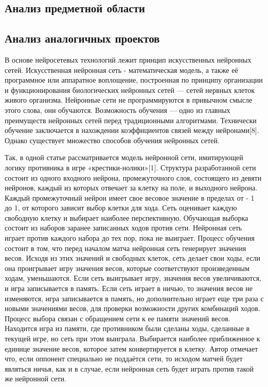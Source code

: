 \newpage
\setlength{\parskip}{0cm}
\begin{Large}
\section{Анализ предметной области}
\subsection{Анализ аналогичных проектов}
В основе нейросетевых технологий лежит принцип искусственных нейронных сетей. Искусственная нейронная сеть - математическая модель, а также её программное или аппаратное воплощение, построенная по принципу организации и функционирования биологических нейронных сетей — сетей нервных клеток живого организма. Нейронные сети не программируются в привычном смысле этого слова, они обучаются. Возможность обучения — одно из главных преимуществ нейронных сетей перед традиционными алгоритмами. Технически обучение заключается в нахождении коэффициентов связей между нейронами[8]. Однако существует множество способов обучения нейронных сетей. 

Так, в одной статье рассматривается модель нейронной сети, имитирующей логику противника в игре «крестики-нолики»[1]. Структура разработанной сети состоит из одного входного нейрона, промежуточного слоя, состоящего из девяти нейронов, каждый из которых отвечает за клетку на поле, и выходного нейрона. Каждый промежуточный нейрон имеет свое весовое значение в пределах от - 1 до 1, от которого зависит выбор клетки для хода. Сеть оценивает каждую свободную клетку и выбирает наиболее перспективную. Обучающая выборка состоит из наборов заранее записанных ходов против сети. Нейронная сеть играет против каждого набора до тех пор, пока не выиграет. Процесс обучения состоит в том, что перед началом матча нейронная сеть генерирует значения весов. Исходя из этих значений и свободных клеток, сеть делает свои ходы, если она проигрывает игру значения весов, которые соответствуют произведенным ходам, уменьшаются. Если сеть выигрывает игру, значения весов увеличиваются, и игра записывается в память. Если сеть играет в ничью, то значения весов не изменяются, игра записывается в память, но дополнительно играет еще три раза с новыми значениями весов, для проверки возможности других комбинаций ходов. Процесс выбора связан с обращением сети к ее памяти значений весов. Находится игра из памяти, где противником были сделаны ходы, сделанные в текущей игре, но сеть при этом выиграла. Выбирается наиболее приближенное к единице значение весов, которое затем конвертируется в клетку. Автор отмечает что, если оппонент специально не поддаётся сети, то исходом матчей будет являться ничья, как и в случае, если нейронная сеть будет играть против такой же нейронной сети.


\end{Large}
